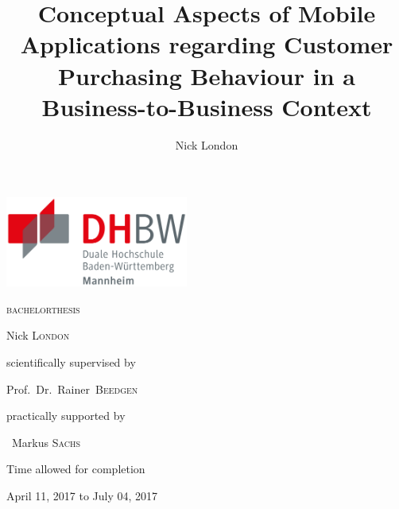 \documentclass[12pt,a4paper,draft,oneside,openright,onecolumn,titlepage]{book}
\author{Nick London}
\title{Conceptual Aspects of Mobile Applications regarding Customer Purchasing Behaviour in a Business-to-Business Context}
\newcounter{savepage}
\begin{document}
\begin{titlepage}
	\includegraphics[height=8em]{img/logos/dhbw.pdf}
	\hfill
	\par
	\centering
	\vfill
	{\huge \textsc{\MakeLowercase{Bachelorthesis}}\par}
	\vspace{2em}
	{\Huge \textbf{\thetitle}\par}
	\vspace{1.5em}
	{\large Nick \textsc{London}\par}
	\vfill
	{scientifically supervised by\par Prof.~Dr.~Rainer~\textsc{Beedgen}\par}
	\par\vspace{1em}
	{practically supported by\par ~Markus \textsc{Sachs}\par}
	\vspace{2em}
	{Time allowed for completion\par April 11, 2017 to July 04, 2017\par}
\end{titlepage}

\setcounter{page}{1}

\tableofcontents

\newpage
{}
\listoffigures

\newpage
{}
\listoftables

\newpage
{}
\setcounter{page}{1}


%
%


\end{document}

